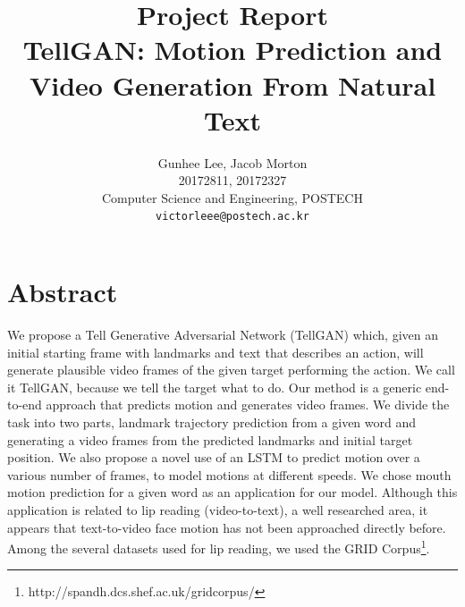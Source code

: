\documentclass[10pt,twocolumn,letterpaper]{article}
\begin{document}
\title{Project Report\\
TellGAN: Motion Prediction and Video Generation From Natural Text}

\author{Gunhee Lee, Jacob Morton\\
20172811, 20172327\\
Computer Science and Engineering, POSTECH\\
{\tt\small victorleee@postech.ac.kr}
}


\maketitle


\section{Abstract}

 We propose a Tell Generative Adversarial Network (TellGAN) which, given an initial starting frame with landmarks and text that describes an action, will generate plausible video frames of the given target performing the action. We call it TellGAN, because we tell the target what to do. Our method is a generic end-to-end approach that predicts motion and generates video frames. We divide the task into two parts, landmark trajectory prediction from a given word and generating a video frames from the predicted landmarks and initial target position. We also propose a novel use of an LSTM to predict motion over a various number of frames, to model motions at different speeds. We chose mouth motion prediction for a given word as an application for our model. Although this application is related to lip reading (video-to-text), a well researched area, it appears that text-to-video face motion has not been approached directly before.  Among the several datasets used for lip reading, we used the GRID Corpus\footnote{http://spandh.dcs.shef.ac.uk/gridcorpus/}.
 
\end{document}
